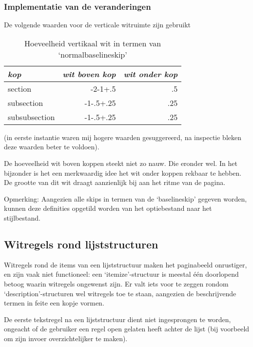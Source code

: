 \documentclass[a4paper]{artikel1} %
\begin{document}
\newpage
\subsubsection{Implementatie van de veranderingen}
De volgende waarden voor de verticale witruimte zijn gebruikt
\begin{table}[ht]
  \begin{center}
    \begin{tabular}{|l|r|r|} \hline
      \emph{kop}   & \emph{wit boven kop}&\emph{wit onder kop}\\ \hline
      section      & -2-1+.5   & .5\\
      subsection   & -1-.5+.25 & .25\\
      subsubsection& -1-.5+.25 & .25\\ \hline
    \end{tabular}
  \end{center}
  \caption{Hoeveelheid vertikaal wit in termen van
    `normalbaselineskip'}
\end{table}
(in eerste instantie waren mij hogere waarden gesuggereerd, na
inspectie bleken deze waarden beter te voldoen).
 
De hoeveelheid wit boven koppen steekt niet zo nauw.  Die eronder wel.
In het bijzonder is het een merkwaardig idee het wit onder koppen
rekbaar te hebben.  De grootte van dit wit draagt aanzienlijk bij aan
het ritme van de pagina.
 
 
Opmerking: Aangezien alle skips in termen van de `baselineskip'
gegeven worden, kunnen deze definities opgetild worden van het
optiebestand naar het stijlbestand.
 
 
\subsection{Witregels rond lijststructuren}
 
Witregels rond de items van een lijststructuur maken het paginabeeld
onrustiger, en zijn vaak niet functioneel: een `itemize'-structuur is
meestal \'e\'en doorlopend betoog waarin witregels ongewenst zijn.  Er
valt iets voor te zeggen rondom `description'-structuren wel witregels
toe te staan, aangezien de beschrijvende termen in feite een kopje
vormen.
 
De eerste tekstregel na een lijststructuur dient niet ingesprongen te
worden, ongeacht of de gebruiker een regel open gelaten heeft achter
de lijst (bij voorbeeld om zijn invoer overzichtelijker te maken).
 
 
\end{document}
